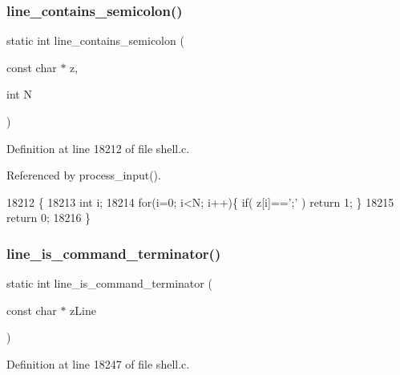\mbox{\label{shell_8c_a024aba96902e971c529231fc190eb2dd}} 
\subsubsection{line\+\_\+contains\+\_\+semicolon()}
{\footnotesize\ttfamily static int line\+\_\+contains\+\_\+semicolon (\begin{DoxyParamCaption}\item[{const char $\ast$}]{z,  }\item[{int}]{N }\end{DoxyParamCaption})\hspace{0.3cm}{\ttfamily [static]}}



Definition at line 18212 of file shell.\+c.



Referenced by process\+\_\+input().


\begin{DoxyCode}
18212                                                         \{
18213   \textcolor{keywordtype}{int} i;
18214   \textcolor{keywordflow}{for}(i=0; i<N; i++)\{  \textcolor{keywordflow}{if}( z[i]==\textcolor{charliteral}{';'} ) \textcolor{keywordflow}{return} 1; \}
18215   \textcolor{keywordflow}{return} 0;
18216 \}
\end{DoxyCode}
\mbox{\label{shell_8c_a5ec09164eaef2f04563ef1f1e4237905}} 
\subsubsection{line\+\_\+is\+\_\+command\+\_\+terminator()}
{\footnotesize\ttfamily static int line\+\_\+is\+\_\+command\+\_\+terminator (\begin{DoxyParamCaption}\item[{const char $\ast$}]{z\+Line }\end{DoxyParamCaption})\hspace{0.3cm}{\ttfamily [static]}}



Definition at line 18247 of file shell.\+c.



